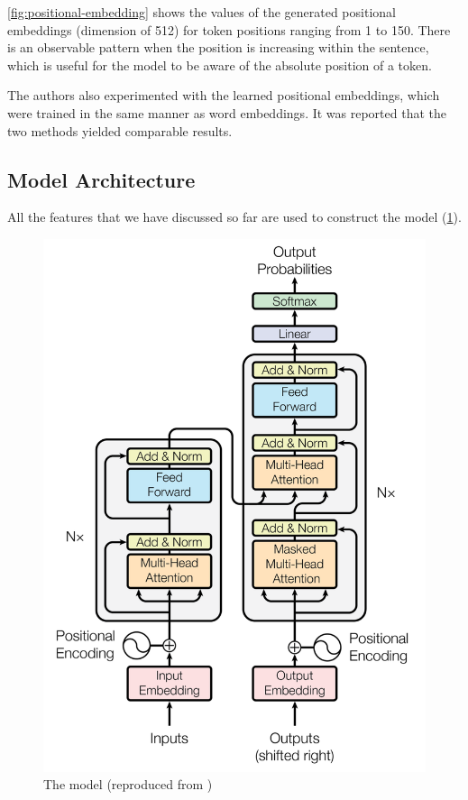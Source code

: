 \cref{fig:positional-embedding} shows the values of the generated positional embeddings (dimension of 512) for token positions ranging from 1 to 150.
There is an observable pattern when the position is increasing within the sentence, which is useful for the model to be aware of the absolute position of a token.

The authors also experimented with the learned positional embeddings, which were trained in the same manner as word embeddings. It was reported that the two methods yielded comparable results.

\subsection{Model Architecture}
\label{lit-trans-arch}

All the features that we have discussed so far are used to construct the \transformer model (\cref{fig:transformer}).

\begin{figure}[t]
    \centering
    \includegraphics[width=0.9\linewidth]{img/transformer.png}
    \caption{The \transformer model (reproduced from \cite{DBLP:conf/nips/VaswaniSPUJGKP17})}
    \label{fig:transformer}
\end{figure}

